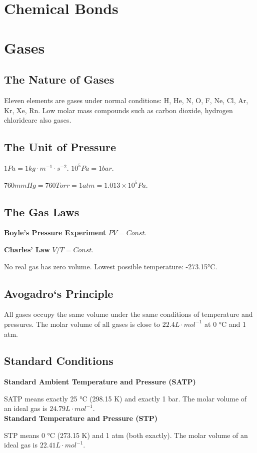 \documentclass[a4paper,12pt]{article}
\begin{document}
\newpage
\section{Chemical Bonds}

\newpage
\section{Gases}
\subsection{The Nature of Gases} Eleven elements are gases under normal conditions: H, He, N, O, F, Ne, Cl, Ar, Kr, Xe, Rn. Low molar mass compounds such as carbon dioxide, hydrogen chlorideare also gases.
\subsection{The Unit of Pressure}
$1 Pa=1 kg\cdot m^{-1}\cdot s^{-2}$. $10^{5} Pa=1 bar$.\par $760 mmHg=760 Torr=1atm=1.013\times 10^{5} Pa$.
\subsection{The Gas Laws}
\textbf{Boyle's Pressure Experiment} $PV=Const.$\par
\textbf{Charles' Law} $V/T=Const.$\par No real gas has zero volume. Lowest possible temperature: -273.15°C.
\subsection{Avogadro‘s Principle}
All gases occupy the same volume under the same conditions of temperature
and pressures. The molar volume of all gases is close to $22.4 L\cdot mol^{-1}$ at 0 °C and 1 atm.
\subsection{Standard Conditions}
\noindent\textbf{Standard Ambient Temperature and Pressure (SATP)}\par SATP means exactly 25 °C (298.15 K) and exactly 1 bar. The molar volume of an ideal gas is $24.79 L\cdot mol^{-1}$.\\
\noindent\textbf{Standard Temperature and Pressure (STP)}\par STP means 0 °C (273.15 K) and 1 atm (both exactly).
The molar volume of an ideal gas is $22.41 L\cdot mol^{-1}$.
\end{document}
